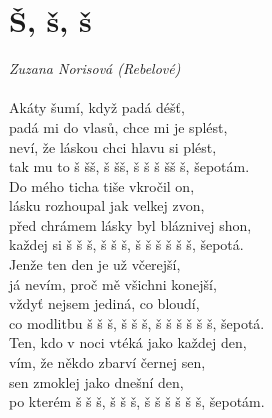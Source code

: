 \section*{\Huge Š, š, š}
\emph{Zuzana Norisová (Rebelové)}\\

\\

Akáty šu\hspace{1cm}mí, když padá déšť,\\
padá mi do vlasů, chce mi je splést,\\
neví, že láskou chci hlavu si plést,\\
tak mu to š š\hspace{0.8cm}š, š š\hspace{0.8cm}š,
š š š šš š, šepotám.\\

Do mého ticha tiše vkročil on,\\
lásku rozhoupal jak velkej zvon,\\
před chrámem lásky byl bláznivej shon,\\
každej si š š š, š š š, š š š š š š, šepotá.\\

Jenže ten den je už včerejší,\\
já nevím, proč mě všichni konejší,\\
vždyť nejsem jediná, co bloudí,\\
co modlitbu š š š, š š š, š š š š š š, šepotá.\\

Ten, kdo v noci vtéká jako každej den,\\
vím, že někdo zbarví černej sen,\\
sen zmoklej jako dnešní den,\\
po kterém š š š, š š š, š š š š š š, šepotám.\\

\newpage
